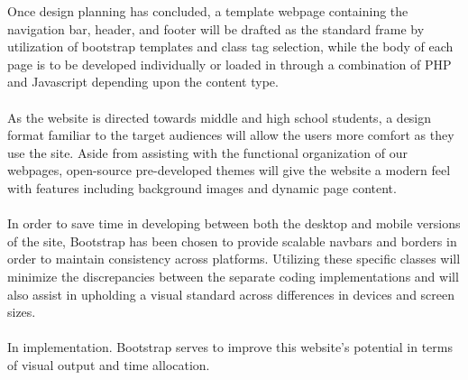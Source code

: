 \documentclass[letterpaper,10pt, draftclsnofoot,onecolumn]{IEEEtran}
\begin{document}
{{{Once design planning has concluded, a template webpage containing the navigation bar, header, and footer will be drafted as the standard frame by utilization of bootstrap templates and class tag selection, while the body of each page is to be developed individually or loaded in through a combination of PHP and Javascript depending upon the content type.
\\ \\
As the website is directed towards middle and high school students, a design format familiar to the target audiences will allow the users more comfort as they use the site. 
Aside from assisting with the functional organization of our webpages, open-source pre-developed themes will give the website a modern feel with features including background images and dynamic page content.
\\ \\
In order to save time in developing between both the desktop and mobile versions of the site, Bootstrap has been chosen to provide scalable navbars and borders in order to maintain consistency across platforms. Utilizing these specific classes will minimize the discrepancies between the separate coding implementations and will also assist in upholding a visual standard across differences in devices and screen sizes. 
\\ \\
In implementation. Bootstrap serves to improve this website's potential in terms of visual output and time allocation.
}

}}
\end{document}
